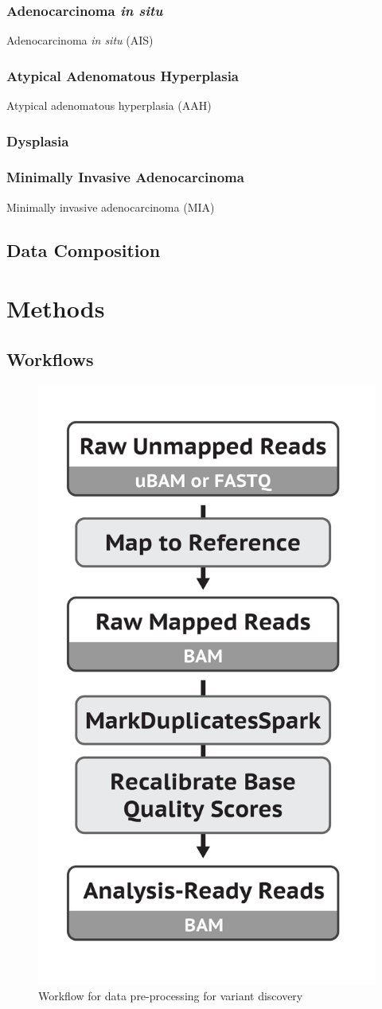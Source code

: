 \documentclass[11pt,a4paper,onecolumn,oneside]{report}
\begin{document}
            \subsubsection{Adenocarcinoma \textit{in situ}}
                Adenocarcinoma \textit{in situ} (AIS)

            \subsubsection{Atypical Adenomatous Hyperplasia}
                Atypical adenomatous hyperplasia (AAH)

            \subsubsection{Dysplasia}

            \subsubsection{Minimally Invasive Adenocarcinoma}
                Minimally invasive adenocarcinoma (MIA)

        \subsection{Data Composition}

    \newpage

    \section{Methods}
        \subsection{Workflows}

            \begin{figure}[p]
                \centering
                \includegraphics[width=0.3 \linewidth]{figures/Workflow/mapping.png}
                \caption{Workflow for data pre-processing for variant discovery \protect\cite{gatk1, gatk2}}
                \label{fig:workflow-preprocessing}
            \end{figure}
\end{document}
